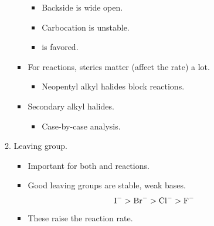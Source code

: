 \documentclass[../notes.tex]{subfiles}
\begin{document}
\begin{itemize}
\begin{enumerate}
\begin{itemize}
\begin{itemize}
                \item Backside is wide open.
                \item Carbocation is unstable.
                \item {} is favored.
            \end{itemize}
            \item For  reactions, sterics matter (affect the rate) a lot.
            \begin{itemize}
                \item Neopentyl alkyl halides block  reactions.
            \end{itemize}
            \item Secondary alkyl halides.
            \begin{itemize}
                \item Case-by-case analysis.
            \end{itemize}
        \end{itemize}
        \item Leaving group.
        \begin{itemize}
            \item Important for both  and  reactions.
            \item Good leaving groups are stable, weak bases.
            \begin{equation*}
                \ce{I-} > \ce{Br-} > \ce{Cl-} > \ce{F-}
            \end{equation*}
            \item These raise the reaction rate.
        \end{itemize}
    \end{enumerate}
\end{itemize}
\end{document}
